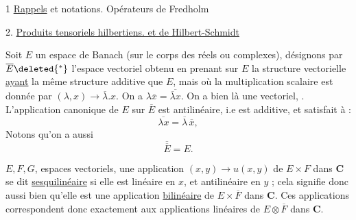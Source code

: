 1 \uline{Rappels}  et notations. Opérateurs de Fredholm

2. \uline{Produits tensoriels hilbertiens.  et de Hilbert-Schmidt}

Soit $E$ un espace de Banach (sur le corps des réels ou complexes), désignons par $\overline E\deleted{{}^*}$ l'espace  vectoriel obtenu en prenant sur $E$ la structure vectorielle \uline{ayant} la même structure additive que $E$, mais où la multiplication scalaire est donnée par $(\lambda,x)\longrightarrow\overline\lambda.x$.
On a $\lambda\overline x=\overline{\overline\lambda x}$.
On a bien là une   vectoriel, .
L'application canonique  de $E$ sur $\overline E$ est antilinéaire, i.e est additive, et satisfait à :
\[
\overline{\lambda x}=\overline\lambda\,\overline x,
\]
Notons qu'on a aussi
\[
\overline{\overline E}=E.
\]


$E,F,G$,   espaces vectoriels, une application $(x,y)\longrightarrow u(x,y)$  de $E\times F$  dans $\mathbf C$ se dit \uline{sesquilinéaire} si elle est linéaire en $x$, et antilinéaire en $y$ ; cela signifie donc aussi bien qu'elle est une application \uline{bilinéaire} de $E\times\overline F$ dans $\mathbf C$. Ces applications correspondent donc exactement aux applications linéaires de $E\otimes\overline F$ dans $\mathbf C$.

